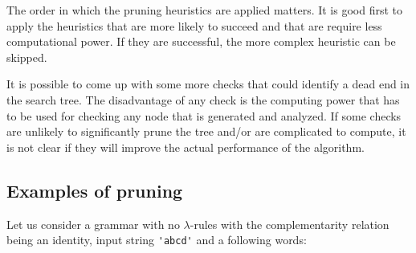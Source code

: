 \medskip

The order in which the pruning heuristics are applied matters. It is good first to apply the heuristics that are more likely to succeed and that are require less computational power. If they are successful, the more complex heuristic can be skipped.

It is possible to come up with some more checks that could identify a dead end in the search tree. The disadvantage of any check is the computing power that has to be used for checking any node that is generated and analyzed. If some checks are unlikely to significantly prune the tree and/or are complicated to compute, it is not clear if they will improve the actual performance of the algorithm.

\subsection{Examples of pruning}
Let us consider a grammar with no $\lambda$-rules with the complementarity relation being an identity, input string \verb/'abcd'/  and a following words:

